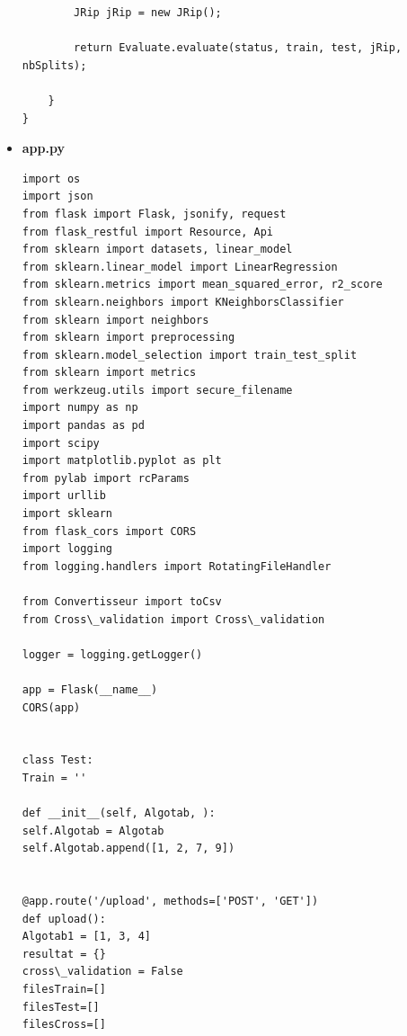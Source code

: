 \documentclass[a4paper,11pt]{article}
\begin{document}
\begin{itemize}
\begin{verbatim}
        JRip jRip = new JRip();

        return Evaluate.evaluate(status, train, test, jRip, nbSplits);

    }
}

\end{verbatim}
\item \textbf{app.py}
\begin{verbatim}
import os
import json
from flask import Flask, jsonify, request
from flask_restful import Resource, Api
from sklearn import datasets, linear_model
from sklearn.linear_model import LinearRegression
from sklearn.metrics import mean_squared_error, r2_score
from sklearn.neighbors import KNeighborsClassifier
from sklearn import neighbors
from sklearn import preprocessing
from sklearn.model_selection import train_test_split
from sklearn import metrics
from werkzeug.utils import secure_filename
import numpy as np
import pandas as pd
import scipy
import matplotlib.pyplot as plt
from pylab import rcParams
import urllib
import sklearn
from flask_cors import CORS
import logging
from logging.handlers import RotatingFileHandler

from Convertisseur import toCsv
from Cross\_validation import Cross\_validation

logger = logging.getLogger()

app = Flask(__name__)
CORS(app)


class Test:
Train = ''

def __init__(self, Algotab, ):
self.Algotab = Algotab
self.Algotab.append([1, 2, 7, 9])


@app.route('/upload', methods=['POST', 'GET'])
def upload():
Algotab1 = [1, 3, 4]
resultat = {}
cross\_validation = False
filesTrain=[]
filesTest=[]
filesCross=[]


\end{verbatim}
\end{itemize}
\end{document}
